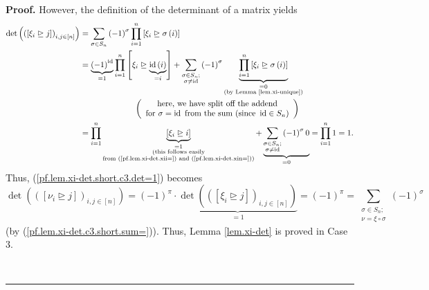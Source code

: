 \documentclass
[numbers=enddot,12pt,final,onecolumn,notitlepage,english]{scrartcl}%
\theoremstyle{definition}
\newenvironment{proof}[1][Proof]{\noindent\textbf{#1.} }{\ \rule{0.5em}{0.5em}}
\let\sumnonlimits\sum
\let\prodnonlimits\prod
\renewcommand{\sum}{\sumnonlimits\limits}
\renewcommand{\prod}{\prodnonlimits\limits}
\newenvironment{vershort}{}{}
\begin{document}
\begin{proof}
\begin{vershort}
However, the definition of the determinant of a matrix yields%
\begin{align*}
\det\left(  \left(  \left[  \xi_{i}\trianglerighteq j\right]  \right)
_{i,j\in\left[  n\right]  }\right)   &  =\sum_{\sigma\in S_{n}}\left(
-1\right)  ^{\sigma}\prod_{i=1}^{n}\left[  \xi_{i}\trianglerighteq
\sigma\left(  i\right)  \right] \\
&  =\underbrace{\left(  -1\right)  ^{\operatorname*{id}}}_{=1}\prod_{i=1}%
^{n}\left[  \xi_{i}\trianglerighteq\underbrace{\operatorname*{id}\left(
i\right)  }_{=i}\right]  +\sum_{\substack{\sigma\in S_{n};\\\sigma
\neq\operatorname*{id}}}\left(  -1\right)  ^{\sigma}\underbrace{\prod
_{i=1}^{n}\left[  \xi_{i}\trianglerighteq\sigma\left(  i\right)  \right]
}_{\substack{=0\\\text{(by Lemma \ref{lem.xi-unique})}}}\\
&  \ \ \ \ \ \ \ \ \ \ \ \ \ \ \ \ \ \ \ \ \left(
\begin{array}
[c]{c}%
\text{here, we have split off the addend}\\
\text{for }\sigma=\operatorname*{id}\text{ from the sum (since }%
\operatorname*{id}\in S_{n}\text{)}%
\end{array}
\right) \\
&  =\prod_{i=1}^{n}\underbrace{\left[  \xi_{i}\trianglerighteq i\right]
}_{\substack{=1\\\text{(this follows easily}\\\text{from
(\ref{pf.lem.xi-det.xii=}) and (\ref{pf.lem.xi-det.xin=}))}}}+\underbrace{\sum
_{\substack{\sigma\in S_{n};\\\sigma\neq\operatorname*{id}}}\left(  -1\right)
^{\sigma}0}_{=0}=\prod_{i=1}^{n}1=1.
\end{align*}
Thus, (\ref{pf.lem.xi-det.short.c3.det=1}) becomes%
\[
\det\left(  \left(  \left[  \nu_{i}\trianglerighteq j\right]  \right)
_{i,j\in\left[  n\right]  }\right)  =\left(  -1\right)  ^{\pi}\cdot
\underbrace{\det\left(  \left(  \left[  \xi_{i}\trianglerighteq j\right]
\right)  _{i,j\in\left[  n\right]  }\right)  }_{=1}=\left(  -1\right)  ^{\pi
}=\sum_{\substack{\sigma\in S_{n};\\\nu=\xi\circ\sigma}}\left(  -1\right)
^{\sigma}%
\]
(by (\ref{pf.lem.xi-det.c3.short.sum=})). Thus, Lemma \ref{lem.xi-det} is
proved in Case 3. \medskip
\end{vershort}


\end{proof}
\end{document}
